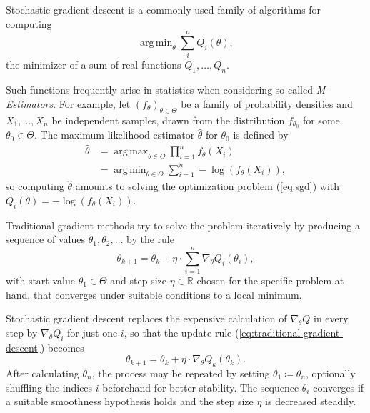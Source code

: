 \documentclass{amsart}
\theoremstyle{plain}
\theoremstyle{definition}
\newcommand{\R}{\mathbb{R}}
\DeclareMathOperator*{\argmin}{arg\,min}
\DeclareMathOperator*{\argmax}{arg\,max}
\begin{document}
Stochastic gradient descent is a commonly used family of algorithms for computing
\begin{equation}
  \label{eq:sgd}
  \argmin_\theta \sum_i^n Q_i(\theta),
\end{equation}
the minimizer of a sum of real functions $Q_1, \dots, Q_n$.

Such functions frequently arise in statistics when considering so called \emph{M-Estimators}.
For example, let $(f_\theta)_{\theta \in \Theta}$ be a family of probability densities and $X_1, \dots, X_n$ be independent samples, drawn from the distribution $f_{\theta_0}$ for some $\theta_0 \in \Theta$.
The maximum likelihood estimator $\hat \theta$ for $\theta_0$ is defined by
\begin{align*}
  \hat \theta & = \argmax_{\theta \in \Theta} \prod_{i = 1}^n f_\theta(X_i) \\
              & = \argmin_{\theta \in \Theta} \sum_{i = 1}^n - \log(f_\theta(X_i)),
\end{align*}
so computing $\hat \theta$ amounts to solving the optimization problem (\ref{eq:sgd}) with $Q_i(\theta) = -\log(f_\theta(X_i))$.

Traditional gradient methods try to solve the problem iteratively by producing a sequence of values $\theta_1, \theta_2, \dots$ by the rule
\begin{equation}
  \label{eq:traditional-gradient-descent}
  \theta_{k + 1} = \theta_{k} + \eta \cdot \sum_{i = 1}^n \nabla_\theta Q_i(\theta_i),
\end{equation}
with start value $\theta_1 \in \Theta$ and step size $\eta \in \R$ chosen for the specific problem at hand, that converges under suitable conditions to a local minimum.

Stochastic gradient descent replaces the expensive calculation of $\nabla_\theta Q$ in every step by $\nabla_\theta Q_i$ for just one $i$, so that the update rule (\ref{eq:traditional-gradient-descent}) becomes
\begin{equation}
  \label{eq:stochastic-gradient-descent}
  \theta_{k + 1} = \theta_k + \eta \cdot \nabla_\theta Q_k(\theta_k).
\end{equation}
After calculating $\theta_n$, the process may be repeated by setting $\theta_1 \coloneqq \theta_n$, optionally shuffling the indices $i$ beforehand for better stability.
The sequence $\theta_i$ converges if a suitable smoothness hypothesis holds and the step size $\eta$ is decreased steadily.
\end{document}
